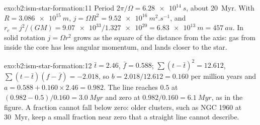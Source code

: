 \begin{solution}{exo:b2:ism-star-formation:11}
Period $2\pi/\Omega = \qty{6.28e14}{s}$, about \qty{20}{Myr}. With
$R = \qty{3.086e15}{m}$, $j = \Omega R^2 = \qty{9.52e16}{m^2.s^{-1}}$, and
$r_c = j^2/(GM) = \num{9.07e33}/\num{1.327e20} = \qty{6.83e13}{m} = \qty{457}{au}$.
In solid rotation $j = \Omega r^2$ grows as the square of the distance from the axis:
gas from inside the core has less angular momentum, and lands closer to the star.
\end{solution}

\begin{solution}{exo:b2:ism-star-formation:12}
$\bar t = 2.46$, $\bar f = 0.588$; $\sum(t - \bar t)^2 = 12.612$,
$\sum(t - \bar t)(f - \bar f) = -2.018$, so $b = 2.018/12.612 = 0.160$ per million
years and $a = 0.588 + 0.160\times2.46 = 0.982$. The line reaches $0.5$ at
$(0.982 - 0.5)/0.160 = \qty{3.0}{Myr}$ and zero at $0.982/0.160 = \qty{6.1}{Myr}$, as in
the figure. A fraction cannot fall below zero: older clusters, such as NGC 1960 at
\qty{30}{Myr}, keep a small fraction near zero that a straight line cannot describe.
\end{solution}

